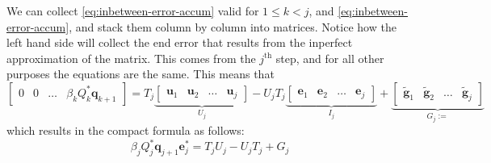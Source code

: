 \documentclass{article}
\begin{document}
We can collect \autoref{eq:inbetween-error-accum} valid for $1 \leq k < j$, and \autoref{eq:inbetween-error-accum}, and stack them column by column into matrices. Notice how the left hand side will collect the end error that results from the inperfect approximation of the matrix. This comes from the $j^{\mathrm{th}}$ step, and for all other purposes the equations are the same.
This means that 
\begin{equation*}
	\begin{bmatrix}
		0 & 0 & \dots & \beta_kQ_{k}^{\ast}\mathbf{q}_{k+1}
	\end{bmatrix} 
	= 
	T_j \underbrace{\begin{bmatrix}
		\textbf{u}_1 &
		\textbf{u}_2 &
		\dots &
		\textbf{u}_j
	\end{bmatrix}}_{U_j}
	- U_j T_j \underbrace{\begin{bmatrix}
		\textbf{e}_1 &
		\textbf{e}_2 &
		\dots &
		\textbf{e}_j
	\end{bmatrix}}_{I_j}
	+ \underbrace{
	\begin{bmatrix}
		\tilde{\textbf{g}}_1 &
		\tilde{\textbf{g}}_2 &
		\dots &
		\tilde{\textbf{g}}_j
	\end{bmatrix}
	}_{G_j:=}
\end{equation*}
which results in the compact formula as follows:
\begin{equation}\label{eq:full-orth-loss}
	\beta_j Q_j^\ast \textbf{q}_{j+1} \textbf{e}_j^\ast = T_j U_j - U_j T_j + G_j 
\end{equation}
\end{document}
